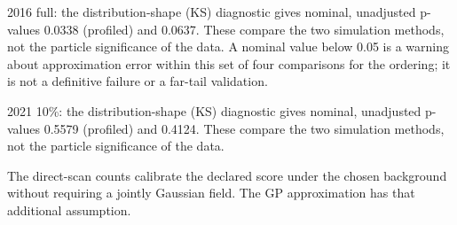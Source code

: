 2016 full: the distribution-shape (KS) diagnostic gives nominal, unadjusted p-values 0.0338 (profiled) and 0.0637. These compare the two simulation methods, not the particle significance of the data. A nominal value below 0.05 is a warning about approximation error within this set of four comparisons for the ordering; it is not a definitive failure or a far-tail validation.

2021 10\%: the distribution-shape (KS) diagnostic gives nominal, unadjusted p-values 0.5579 (profiled) and 0.4124. These compare the two simulation methods, not the particle significance of the data.

The direct-scan counts calibrate the declared score under the chosen background without requiring a jointly Gaussian field. The GP approximation has that additional assumption.
